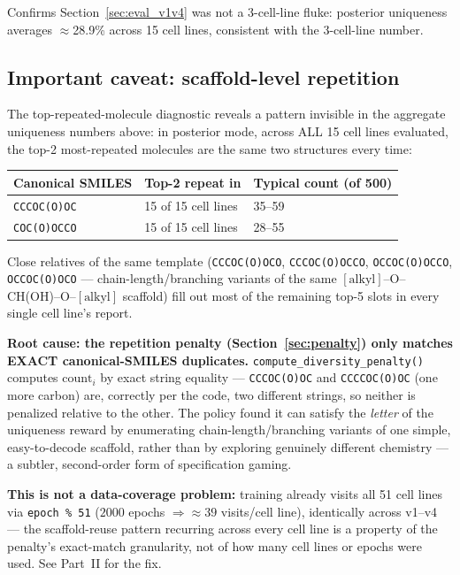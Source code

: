 \documentclass[11pt]{article}
\newcommand{\code}[1]{\texttt{#1}}
\begin{document}
Confirms Section~\ref{sec:eval_v1v4} was not a 3-cell-line fluke: posterior uniqueness averages $\approx$28.9\% across 15 cell lines, consistent with the 3-cell-line number.

\subsection{Important caveat: scaffold-level repetition}
\label{sec:scaffold}

The top-repeated-molecule diagnostic reveals a pattern invisible in the aggregate uniqueness numbers above: in posterior mode, across ALL 15 cell lines evaluated, the top-2 most-repeated molecules are the same two structures every time:

\begin{center}
\begin{tabular}{@{}l l l@{}}
\toprule
\textbf{Canonical SMILES} & \textbf{Top-2 repeat in} & \textbf{Typical count (of 500)} \\
\midrule
\code{CCCOC(O)OC} & 15 of 15 cell lines & 35--59 \\
\code{COC(O)OCCO} & 15 of 15 cell lines & 28--55 \\
\bottomrule
\end{tabular}
\end{center}

Close relatives of the same template (\code{CCCOC(O)OCO}, \code{CCCOC(O)OCCO}, \code{OCCOC(O)OCCO}, \code{OCCOC(O)OCO} --- chain-length/branching variants of the same $[\text{alkyl}]$--O--CH(OH)--O--$[\text{alkyl}]$ scaffold) fill out most of the remaining top-5 slots in every single cell line's report.

\textbf{Root cause: the repetition penalty (Section~\ref{sec:penalty}) only matches EXACT canonical-SMILES duplicates.} \code{compute\_diversity\_penalty()} computes $\text{count}_i$ by exact string equality --- \code{CCCOC(O)OC} and \code{CCCCOC(O)OC} (one more carbon) are, correctly per the code, two different strings, so neither is penalized relative to the other. The policy found it can satisfy the \emph{letter} of the uniqueness reward by enumerating chain-length/branching variants of one simple, easy-to-decode scaffold, rather than by exploring genuinely different chemistry --- a subtler, second-order form of specification gaming.

\textbf{This is not a data-coverage problem:} training already visits all 51 cell lines via \code{epoch \% 51} ($2000$ epochs $\Rightarrow \approx 39$ visits/cell line), identically across v1--v4 --- the scaffold-reuse pattern recurring across every cell line is a property of the penalty's exact-match granularity, not of how many cell lines or epochs were used. See Part~II for the fix.
\end{document}
